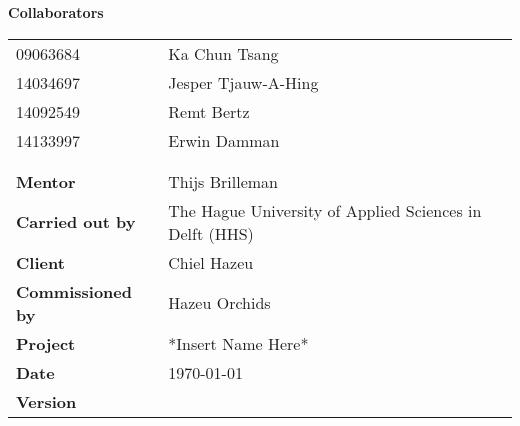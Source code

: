 \begin{titlepage}
		
	\begin{center}
		\LARGE{\textbf{\thistitle}}
	\end{center}
	
	\begin{figure}[h]
	\end{figure}
	
	\bigskip
	\textbf{Collaborators}
	\begin{table}[h]
		\begin{tabular}{@{}ll@{}}
			09063684                 & Ka Chun Tsang                                           \\
			14034697                 & Jesper Tjauw-A-Hing                           		               \\
			14092549                 & Remt Bertz                	                           \\
			14133997                 & Erwin Damman                                            \\
			                         &              										   \\
			                         &              										   \\
			\textbf{Mentor}          & Thijs Brilleman                                         \\
			\textbf{Carried out by}  & The Hague University of Applied Sciences in Delft (HHS) \\
			\textbf{Client}          & Chiel Hazeu                                             \\
			\textbf{Commissioned by} & Hazeu Orchids                                           \\
			\textbf{Project}         & *Insert Name Here*                                      \\
			\textbf{Date}            & \today                                                  \\
			\textbf{Version}         & \version          									   \\
		\end{tabular}
	\end{table}
\end{titlepage}


